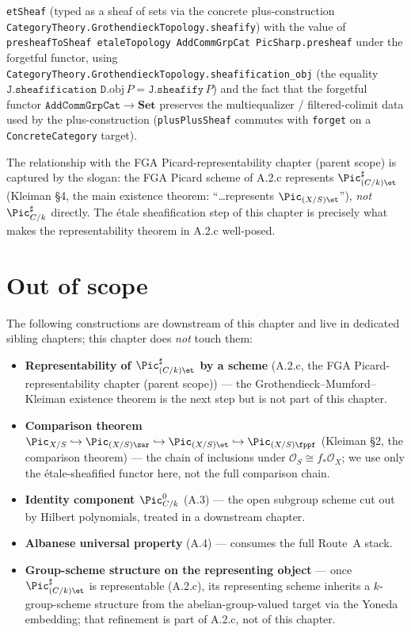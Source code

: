 \begin{itemize}
    \texttt{etSheaf} (typed as a sheaf of sets via the concrete
    plus-construction
    \texttt{CategoryTheory.GrothendieckTopology.sheafify}) with the
    value of \texttt{presheafToSheaf etaleTopology AddCommGrpCat
    PicSharp.presheaf} under the forgetful functor, using
    \texttt{CategoryTheory.GrothendieckTopology.sheafification\_obj}
    (the equality \(\texttt{J.sheafification D}.\mathrm{obj}\, P =
    \texttt{J.sheafify}\, P\)) and the fact that the forgetful functor
    \(\texttt{AddCommGrpCat} \to \mathbf{Set}\) preserves the
    multiequalizer / filtered-colimit data used by the
    plus-construction (\texttt{plusPlusSheaf} commutes with
    \texttt{forget} on a \texttt{ConcreteCategory} target).
\end{itemize}

The relationship with the FGA Picard-representability chapter (parent scope) is captured by
the slogan: the FGA Picard scheme of A.2.c represents
\(\Pic^\sharp_{(C/k)\et}\) (Kleiman \S 4, the main existence theorem: ``\dots represents
\(\Pic_{(X/S)\et}\)''), \emph{not} \(\Pic^\sharp_{C/k}\) directly. The \'etale
sheafification step of this chapter is precisely what makes the
representability theorem in A.2.c well-posed.

\section{Out of scope}
\label{sec:relpic_out_of_scope}

The following constructions are downstream of this chapter and live in
dedicated sibling chapters; this chapter does \emph{not} touch them:
\begin{itemize}
  \item \textbf{Representability of \(\Pic^\sharp_{(C/k)\et}\) by a scheme}
    (A.2.c, the FGA Picard-representability chapter (parent scope)) --- the
    Grothendieck--Mumford--Kleiman existence theorem is the next step but is
    not part of this chapter.
  \item \textbf{Comparison theorem $\Pic_{X/S} \hookrightarrow
    \Pic_{(X/S)\zar} \hookrightarrow \Pic_{(X/S)\et} \hookrightarrow
    \Pic_{(X/S)\fppf}$} (Kleiman \S 2, the comparison theorem) --- the chain of inclusions
    under \(\mathcal{O}_S \cong f_*\mathcal{O}_X\); we use only the
    \'etale-sheafified functor here, not the full comparison chain.
  \item \textbf{Identity component \(\Pic^0_{C/k}\)} (A.3) --- the open subgroup
    scheme cut out by Hilbert polynomials, treated in a downstream chapter.
  \item \textbf{Albanese universal property} (A.4) --- consumes the full
    Route~A stack.
  \item \textbf{Group-scheme structure on the representing object} --- once
    \(\Pic^\sharp_{(C/k)\et}\) is representable (A.2.c), its representing scheme
    inherits a \(k\)-group-scheme structure from the abelian-group-valued
    target via the Yoneda embedding; that refinement is part of A.2.c, not
    of this chapter.
\end{itemize}

